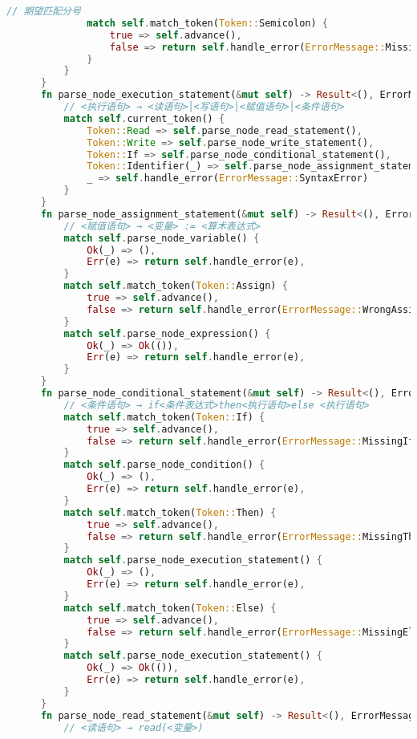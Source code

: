 \begin{lstlisting}[caption={语法分析器parse.rs}, label={4:code-example}, captionpos=t, language=rust]
              // 期望匹配分号
              match self.match_token(Token::Semicolon) {
                  true => self.advance(),
                  false => return self.handle_error(ErrorMessage::MissingSemicolon),
              }
          }
      }
      fn parse_node_execution_statement(&mut self) -> Result<(), ErrorMessage>{
          // <执行语句> → <读语句>│<写语句>│<赋值语句>│<条件语句>
          match self.current_token() {
              Token::Read => self.parse_node_read_statement(),
              Token::Write => self.parse_node_write_statement(),
              Token::If => self.parse_node_conditional_statement(),
              Token::Identifier(_) => self.parse_node_assignment_statement(),
              _ => self.handle_error(ErrorMessage::SyntaxError)
          }
      }
      fn parse_node_assignment_statement(&mut self) -> Result<(), ErrorMessage>{
          // <赋值语句> → <变量> := <算术表达式>
          match self.parse_node_variable() {
              Ok(_) => (),
              Err(e) => return self.handle_error(e),
          }
          match self.match_token(Token::Assign) {
              true => self.advance(),
              false => return self.handle_error(ErrorMessage::WrongAssignToken)
          }
          match self.parse_node_expression() {
              Ok(_) => Ok(()),
              Err(e) => return self.handle_error(e),
          }
      }
      fn parse_node_conditional_statement(&mut self) -> Result<(), ErrorMessage>{
          // <条件语句> → if<条件表达式>then<执行语句>else <执行语句>
          match self.match_token(Token::If) {
              true => self.advance(),
              false => return self.handle_error(ErrorMessage::MissingIf)
          }
          match self.parse_node_condition() {
              Ok(_) => (),
              Err(e) => return self.handle_error(e),
          }
          match self.match_token(Token::Then) {
              true => self.advance(),
              false => return self.handle_error(ErrorMessage::MissingThen)
          }
          match self.parse_node_execution_statement() {
              Ok(_) => (),
              Err(e) => return self.handle_error(e),
          }
          match self.match_token(Token::Else) {
              true => self.advance(),
              false => return self.handle_error(ErrorMessage::MissingElse)
          }
          match self.parse_node_execution_statement() {
              Ok(_) => Ok(()),
              Err(e) => return self.handle_error(e),
          }
      }
      fn parse_node_read_statement(&mut self) -> Result<(), ErrorMessage>{
          // <读语句> → read(<变量>)

\end{lstlisting}

